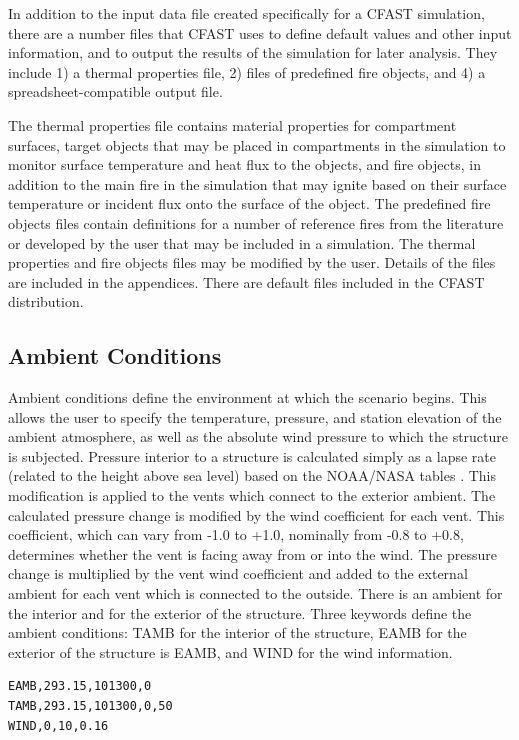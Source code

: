 In addition to the input data file created specifically for a CFAST simulation, there are a number files that CFAST uses to define default values and other input information, and to output the results of the simulation for later analysis.  They include 1) a thermal properties file, 2) files of predefined fire objects, and 4) a spreadsheet-compatible output file.

The thermal properties file contains material properties for compartment surfaces, target objects that may be placed in compartments in the simulation to monitor surface temperature and heat flux to the objects, and fire objects, in addition to the main fire in the simulation that may ignite based on their surface temperature or incident flux onto the surface of the object. The predefined fire objects files contain definitions for a number of reference fires from the literature or developed by the user that may be included in a simulation. The thermal properties and fire objects files may be modified by the user.  Details of the files are included in the appendices.  There are default files included in the CFAST distribution.

\subsection{Ambient Conditions}

Ambient conditions define the environment at which the scenario begins. This allows the user to specify the temperature, pressure, and station elevation of the ambient atmosphere, as well as the absolute wind pressure to which the structure is subjected.  Pressure interior to a structure is calculated simply as a lapse rate (related to the height above sea level) based on the NOAA/NASA tables \cite{GPO:Atmosphere}.  This modification is applied to the vents which connect to the exterior ambient.  The calculated pressure change is modified by the wind coefficient for each vent.  This coefficient, which can vary from -1.0 to +1.0, nominally from -0.8 to +0.8, determines whether the vent is facing away from or into the wind.  The pressure change is multiplied by the vent wind coefficient and added to the external ambient for each vent which is connected to the outside. There is an ambient for the interior and for the exterior of the structure.  Three keywords define the ambient conditions: TAMB for the interior of the structure, EAMB for the exterior of the structure is EAMB, and WIND for the wind information.

\begin{lstlisting}
EAMB,293.15,101300,0
TAMB,293.15,101300,0,50
WIND,0,10,0.16
\end{lstlisting}

